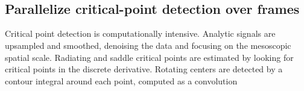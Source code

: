 \documentclass[11pt]{article}
\begin{document}
    \begin{center}
    \end{center}
    { \hspace*{\fill} \\}
    
    \begin{center}
    \end{center}
    { \hspace*{\fill} \\}
    
    \subsection{Parallelize critical-point detection over
frames}\label{parallelize-critical-point-detection-over-frames}

Critical point detection is computationally intensive. Analytic signals
are upsampled and smoothed, denoising the data and focusing on the
mesoscopic spatial scale. Radiating and saddle critical points are
estimated by looking for critical points in the discrete derivative.
Rotating centers are detected by a contour integral around each point,
computed as a convolution
\end{document}

